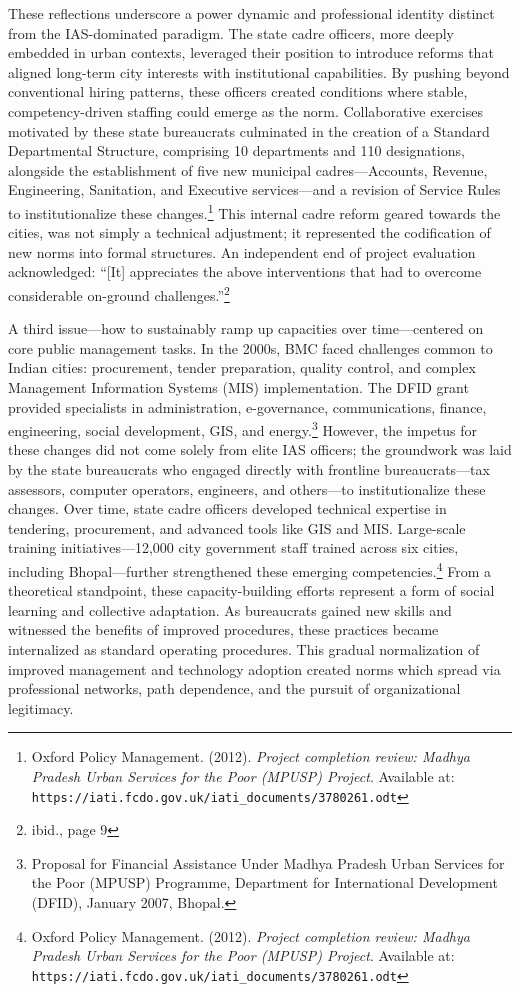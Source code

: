  These reflections underscore a power dynamic and professional identity distinct from the IAS-dominated paradigm. The state cadre officers, more deeply embedded in urban contexts, leveraged their position to introduce reforms that aligned long-term city interests with institutional capabilities. By pushing beyond conventional hiring patterns, these officers created conditions where stable, competency-driven staffing could emerge as the norm. Collaborative exercises motivated by these state bureaucrats culminated in the creation of a Standard Departmental Structure, comprising 10 departments and 110 designations, alongside the establishment of five new municipal cadres—Accounts, Revenue, Engineering, Sanitation, and Executive services—and a revision of Service Rules to institutionalize these changes.\footnote{Oxford Policy Management. (2012). \textit{Project completion review: Madhya Pradesh Urban Services for the Poor (MPUSP) Project}. Available at: \nolinkurl{https://iati.fcdo.gov.uk/iati_documents/3780261.odt}} This internal cadre reform geared towards the cities, was not simply a technical adjustment; it represented the codification of new norms into formal structures. An independent end of project evaluation  acknowledged: “[It] appreciates the above interventions that had to overcome considerable on-ground challenges.”\footnote{ibid., page 9}

A third issue—how to sustainably ramp up capacities over time—centered on core public management tasks. In the 2000s, BMC faced challenges common to Indian cities: procurement, tender preparation, quality control, and complex Management Information Systems (MIS) implementation. The DFID grant provided specialists in administration, e-governance, communications, finance, engineering, social development, GIS, and energy.\footnote {Proposal for Financial Assistance Under Madhya Pradesh Urban Services for the Poor (MPUSP) Programme, Department for International Development (DFID), January 2007, Bhopal.}
However, the impetus for these changes did not come solely from elite IAS officers; the groundwork was laid by the state bureaucrats who engaged directly with frontline bureaucrats—tax assessors, computer operators, engineers, and others—to institutionalize these changes. Over time, state cadre officers developed technical expertise in tendering, procurement, and advanced tools like GIS and MIS. Large-scale training initiatives—12,000 city government staff trained across six cities, including Bhopal—further strengthened these emerging competencies.\footnote{Oxford Policy Management. (2012). \textit{Project completion review: Madhya Pradesh Urban Services for the Poor (MPUSP) Project}. Available at: \nolinkurl{https://iati.fcdo.gov.uk/iati_documents/3780261.odt}} From a theoretical standpoint, these capacity-building efforts represent a form of social learning and collective adaptation. As bureaucrats gained new skills and witnessed the benefits of improved procedures, these practices became internalized as standard operating procedures. This gradual normalization of improved management and technology adoption created norms which spread via professional networks, path dependence, and the pursuit of organizational legitimacy.


